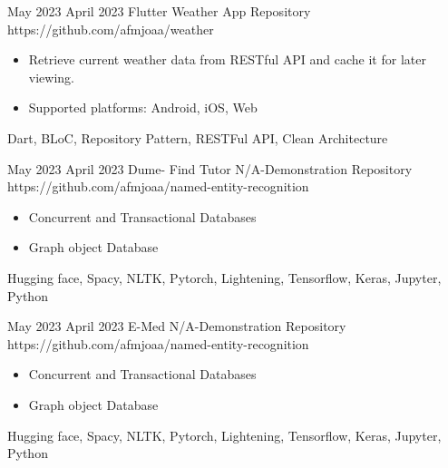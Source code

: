 \begin{universalList}
  \emptySeparator
  \universalListItemWithoutLink
    {May 2023}
    {April 2023}
    {Flutter Weather App}
    {Repository}
    {https://github.com/afmjoaa/weather}
    {
      \begin{itemize}
        \item Retrieve current weather data from RESTful API and cache it for later viewing.
        \item Supported platforms: Android, iOS, Web
      \end{itemize}
    }
    {Dart, BLoC, Repository Pattern, RESTFul API, Clean Architecture}

  \emptySeparator
  \universalListItem
    {May 2023}
    {April 2023}
    {Dume- Find Tutor}
    {N/A-Demonstration}
    {Repository}
    {https://github.com/afmjoaa/named-entity-recognition}
    {
      \begin{itemize}
        \item Concurrent and Transactional Databases
        \item Graph object Database
      \end{itemize}
    }
    {Hugging face, Spacy, NLTK, Pytorch, Lightening, Tensorflow, Keras, Jupyter, Python}

  \emptySeparator
  \universalListItem
    {May 2023}
    {April 2023}
    {E-Med}
    {N/A-Demonstration}
    {Repository}
    {https://github.com/afmjoaa/named-entity-recognition}
    {
      \begin{itemize}
        \item Concurrent and Transactional Databases
        \item Graph object Database
      \end{itemize}
    }
    {Hugging face, Spacy, NLTK, Pytorch, Lightening, Tensorflow, Keras, Jupyter, Python}
\end{universalList}

